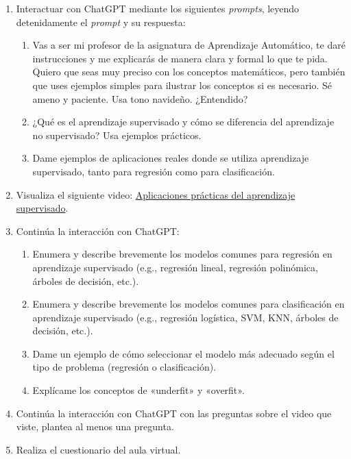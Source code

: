 \documentclass[a4,11pt]{aleph-notas}
\begin{document}
\begin{enumerate}[leftmargin=*]
    \item Interactuar con ChatGPT mediante los siguientes \textit{prompts}, leyendo detenidamente el \textit{prompt} y su respuesta:
    \begin{enumerate}[label=\textit{Prompt \arabic*.},leftmargin=2.1cm]
        \item Vas a ser mi profesor de la asignatura de Aprendizaje Automático, te daré instrucciones y me explicarás de manera clara y formal lo que te pida. Quiero que seas muy preciso con los conceptos matemáticos, pero también que uses ejemplos simples para ilustrar los conceptos si es necesario. Sé ameno y paciente. Usa tono navideño. ¿Entendido?
        \item ¿Qué es el aprendizaje supervisado y cómo se diferencia del aprendizaje no supervisado? Usa ejemplos prácticos.
        \item Dame ejemplos de aplicaciones reales donde se utiliza aprendizaje supervisado, tanto para regresión como para clasificación.
    \end{enumerate}
    \item Visualiza el siguiente video: \href{https://youtu.be/ijJYeLFtiVM?si=_ye7QDqMGJc9lvB8}{Aplicaciones prácticas del aprendizaje supervisado}.
    \item Continúa la interacción con ChatGPT:
    \begin{enumerate}[label=\textit{Prompt \arabic*.},leftmargin=2.1cm, start=4]
        \item Enumera y describe brevemente los modelos comunes para regresión en aprendizaje supervisado (e.g., regresión lineal, regresión polinómica, árboles de decisión, etc.).
        \item Enumera y describe brevemente los modelos comunes para clasificación en aprendizaje supervisado (e.g., regresión logística, SVM, KNN, árboles de decisión, etc.).
        \item Dame un ejemplo de cómo seleccionar el modelo más adecuado según el tipo de problema (regresión o clasificación).
        \item Explícame los conceptos de «underfit» y «overfit».
    \end{enumerate}
    \item Continúa la interacción con ChatGPT con las preguntas sobre el video que viste, plantea al menos una pregunta.
    \item Realiza el cuestionario del aula virtual.
\end{enumerate}
\end{document}
